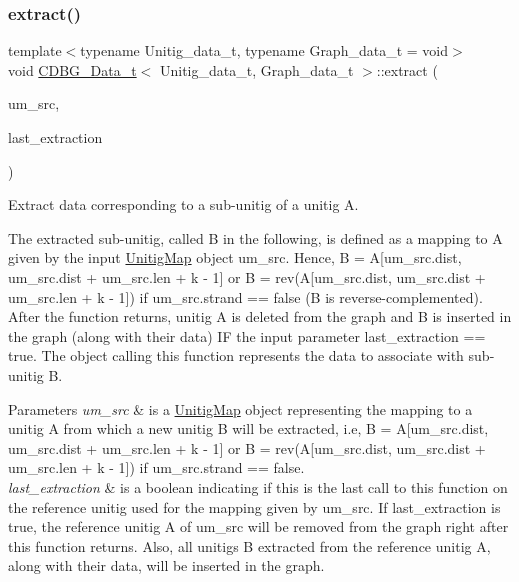 \subsubsection{\texorpdfstring{extract()}{extract()}}
{\footnotesize\ttfamily template$<$typename Unitig\+\_\+data\+\_\+t, typename Graph\+\_\+data\+\_\+t = void$>$ \\
void \hyperlink{classCDBG__Data__t}{C\+D\+B\+G\+\_\+\+Data\+\_\+t}$<$ Unitig\+\_\+data\+\_\+t, Graph\+\_\+data\+\_\+t $>$\+::extract (\begin{DoxyParamCaption}\item[{const \hyperlink{classUnitigMap}{Unitig\+Map}$<$ Unitig\+\_\+data\+\_\+t, Graph\+\_\+data\+\_\+t $>$ \&}]{um\+\_\+src,  }\item[{bool}]{last\+\_\+extraction }\end{DoxyParamCaption})\hspace{0.3cm}{\ttfamily [inline]}}



Extract data corresponding to a sub-\/unitig of a unitig A. 

The extracted sub-\/unitig, called B in the following, is defined as a mapping to A given by the input \hyperlink{classUnitigMap}{Unitig\+Map} object um\+\_\+src. Hence, B = A\mbox{[}um\+\_\+src.\+dist, um\+\_\+src.\+dist + um\+\_\+src.\+len + k -\/ 1\mbox{]} or B = rev(A\mbox{[}um\+\_\+src.\+dist, um\+\_\+src.\+dist + um\+\_\+src.\+len + k -\/ 1\mbox{]}) if um\+\_\+src.\+strand == false (B is reverse-\/complemented). After the function returns, unitig A is deleted from the graph and B is inserted in the graph (along with their data) IF the input parameter last\+\_\+extraction == true. The object calling this function represents the data to associate with sub-\/unitig B. 
\begin{DoxyParams}{Parameters}
{\em um\+\_\+src} & is a \hyperlink{classUnitigMap}{Unitig\+Map} object representing the mapping to a unitig A from which a new unitig B will be extracted, i.\+e, B = A\mbox{[}um\+\_\+src.\+dist, um\+\_\+src.\+dist + um\+\_\+src.\+len + k -\/ 1\mbox{]} or B = rev(A\mbox{[}um\+\_\+src.\+dist, um\+\_\+src.\+dist + um\+\_\+src.\+len + k -\/ 1\mbox{]}) if um\+\_\+src.\+strand == false. \\
\hline
{\em last\+\_\+extraction} & is a boolean indicating if this is the last call to this function on the reference unitig used for the mapping given by um\+\_\+src. If last\+\_\+extraction is true, the reference unitig A of um\+\_\+src will be removed from the graph right after this function returns. Also, all unitigs B extracted from the reference unitig A, along with their data, will be inserted in the graph. \\
\hline
\end{DoxyParams}
\mbox{\label{classCDBG__Data__t_a474f0f1668ae99e7ca0ee071d1f6f237}} 
